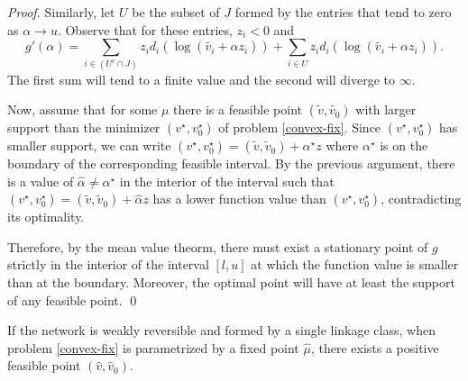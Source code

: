\documentclass[smallextended]{svjour3}       %
\newcommand*{\0}{\mathbf{0}}
\newcommand*{\1}{\mathbf{1}}
\begin{document}
\begin{proof}
	Similarly, let $U$ be the subset of $J$ formed by the entries that tend to zero as 
	$\alpha\rightarrow u$. Observe that for these entries, $z_i<0$ and
  \[
    g'(\alpha) = \sum_{i\in (U^c\cap J)} z_i d_i(\log{(\tilde{v_i}+\alpha z_i)})
               + \sum_{i\in U}   z_i d_i(\log{(\tilde{v_i}+\alpha z_i)}).
  \]
	The first sum will tend to a finite value and the second will diverge to
	$\infty$. 
	
	Now, assume that for some $\mu$ there is a feasible point
	$(\tilde{v},\tilde{v_0})$ with larger support than the minimizer
	$(v^\star,v^\star_0)$ of problem \eqref{convex-fix}.  Since
	$(v^\star,v_0^\star)$ has smaller support, we can write  $(v^\star,
	v_0^\star) = (\tilde{v},\tilde{v}_0) + \alpha^\star z$ where $\alpha^\star$
	is on the boundary of the corresponding feasible interval.  By the
	previous argument, there is a value of $\hat \alpha \neq \alpha^\star$ in the
	interior of the interval such that $(v^\star, v_0^\star) =
	(\tilde{v},\tilde{v}_0) + \hat \alpha z$ has a lower function value than
	$(v^\star,v^\star_0)$, contradicting its optimality.

	Therefore, by the mean value theorm, there must exist a stationary point of
	$g$ strictly in the interior of the interval $[l,u]$ at which the function
	value is smaller than at the boundary.  Moreover, the optimal point will have
	at least the support of any feasible point.  
   \qed
\end{proof}



\begin{lemma}
	If the network is weakly reversible and formed by a single linkage class, when problem
	\eqref{convex-fix} is parametrized by a fixed point $\hat\mu$,  there
	exists a positive feasible point $(\hat v,\hat v_0)$.
\label{positive-feasible}
\end{lemma}
\end{document}
